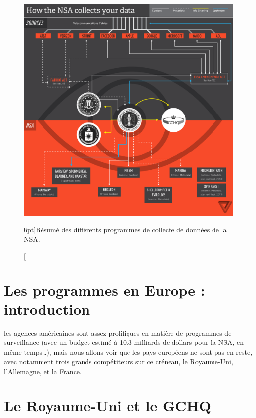 \begin{figure}
\includegraphics{flow.png}
\caption[Infographie résumant les différents programmes de
surveillance américains][6pt]{Résumé des différents programmes de collecte de
données de la NSA.}
\label{fig:infographie}
\end{figure}

\newpage

\section{Les programmes en Europe : introduction}
 les agences américaines sont assez prolifiques en
matière de programmes de surveillance (avec un budget estimé à 10.3 milliards de
dollars pour la NSA\autocite{budget}, en même temps\ldots), mais nous allons voir
que les pays européens ne sont pas en reste, avec notamment trois grands compétiteurs sur ce
créneau, le Royaume-Uni, l'Allemagne, et la France.


\section{Le Royaume-Uni et le GCHQ}

